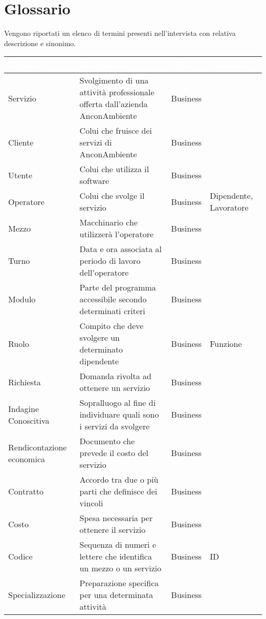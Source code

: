 \documentclass[green, fancy, 11pt]{elegantbook}
\begin{document}
\section{Glossario}
Vengono riportati un elenco di termini presenti nell'intervista con relativa descrizione e sinonimo.
{
	\begin{table}[H]
		\centering
	\begin{tabular}{|p{}|p{8cm}|l|p{4cm}|}
		\hline
		\rowcolor{DarkGreen}
		\textbf{\textcolor{white}{Termine}} & \textbf{\textcolor{white}{Descrizione}} & \textbf{\textcolor{white}{Tipo}} & \textbf{\textcolor{white}{Sinonimo}}\\
		\hline
		Servizio & Svolgimento di una attività professionale offerta dall'azienda AnconAmbiente & Business & \\
		\hline
		Cliente &Colui che fruisce dei servizi di AnconAmbiente &Business&\\
		\hline
		Utente & Colui che utilizza il software&Business&\\
		\hline
		Operatore & Colui che svolge il servizio& Business& Dipendente, Lavoratore\\
		\hline
		Mezzo & Macchinario che utilizzerà l'operatore&Business&\\
		\hline
		Turno & Data e ora associata al periodo di lavoro dell'operatore&Business&\\
		\hline
		Modulo&Parte del programma accessibile secondo determinati criteri&Business&\\
		\hline
		Ruolo &Compito che deve svolgere un determinato dipendente &Business& Funzione\\
		\hline
		Richiesta &Domanda rivolta ad ottenere un servizio& Business &\\
		\hline
		Indagine Conoscitiva &Sopralluogo al fine di individuare quali sono i servizi da svolgere &Business&\\ 
		\hline
		Rendicontazione economica& Documento che prevede il costo del servizio &Business&\\
		\hline
		Contratto &Accordo tra due o più parti che definisce dei vincoli &Business&\\
		\hline
		Costo & Spesa necessaria per ottenere il servizio &Business&\\
		\hline
		Codice & Sequenza di numeri e lettere che identifica un mezzo o un servizio &Business&ID\\ 
		\hline
		Specializzazione &Preparazione specifica per una determinata attività &Business& \\

\end{tabular}
\end{table}}
\end{document}

